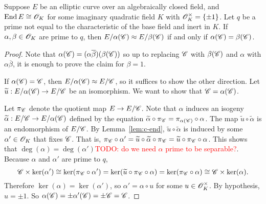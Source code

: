 \documentclass{amsart}
\begin{document}
\begin{lemma}\label{lem:c-subgps-distinct-quotients}
  Suppose $E$ be an elliptic curve over an algebraically closed field, and $\operatorname{End} E \cong \mathscr{O}_K$ for some imaginary quadratic field $K$ with $\mathscr{O}_K^\times = \{\pm 1\}$. Let $q$ be a prime not equal to the characteristic of the base field and inert in $K$. If $\alpha,\beta \in \mathscr{O}_K$ are prime to $q$, then $E/\alpha(\mathscr{C}) \approx E/\beta(\mathscr{C})$ if and only if $\alpha(\mathscr{C}) = \beta(\mathscr{C})$.
\end{lemma}
\begin{proof}
  Note that $\alpha(\mathscr{C}) = (\alpha\overline{\beta})(\beta(\mathscr{C}))$ so up to replacing $\mathscr{C}$ with $\beta(\mathscr{C})$ and $\alpha$ with $\alpha\overline{\beta}$, it is enough to prove the claim for $\beta = 1$.

  If $\alpha(\mathscr{C}) = \mathscr{C}$, then $E/\alpha(\mathscr{C}) \approx E/\mathscr{C}$, so it suffices to show the other direction. Let $\widetilde{u}: E/\alpha(\mathscr{C}) \to E/\mathscr{C}$ be an isomorphism. We want to show that $\mathscr{C} = \alpha(\mathscr{C})$.

  Let $\pi_{\mathscr{C}}$ denote the quotient map $E \to E/\mathscr{C}$. Note that $\alpha$ induces an isogeny $\widetilde{\alpha}: E/\mathscr{C} \to E/\alpha(\mathscr{C})$ defined by the equation $\widetilde{\alpha}\circ\pi_{\mathscr{C}} = \pi_{\alpha(\mathscr{C})} \circ \alpha$. The map $\tilde{u}\circ\tilde{\alpha}$ is an endomorphism of $E/\mathscr{C}$. By Lemma~\ref{lem:c-end}, $\tilde{u}\circ\tilde{\alpha}$ is induced by some $\alpha' \in \mathscr{O}_K$ that fixes $\mathscr{C}$. That is, $\pi_{\mathscr{C}}\circ\alpha' = \widetilde{u}\circ\widetilde{\alpha}\circ\pi_{\mathscr{C}} = \widetilde{u}\circ\pi_{\mathscr{C}}\circ\alpha$. This shows that $\deg(\alpha) = \deg(\alpha')$\textcolor{red}{TODO: do we need $\alpha$ prime to be separable?}. Because $\alpha$ and $\alpha'$ are prime to $q$,
  \[
    \mathscr{C} \times \ker(\alpha')
    \cong
    \ker(\pi_{\mathscr{C}} \circ \alpha')
    =
    \ker(\widetilde{u}\circ\pi_{\mathscr{C}}\circ\alpha)
    =
    \ker(\pi_{\mathscr{C}}\circ\alpha)
    \cong
    \mathscr{C} \times \ker(\alpha).
  \]
  Therefore $\ker(\alpha) = \ker(\alpha')$, so $\alpha' = \alpha\circ u$ for some $u \in \mathscr{O}_K^\times$. By hypothesis, $u = \pm 1$. So $\alpha(\mathscr{C}) = \pm\alpha'(\mathscr{C}) = \pm\mathscr{C} = \mathscr{C}$.

\end{proof}
\end{document}
